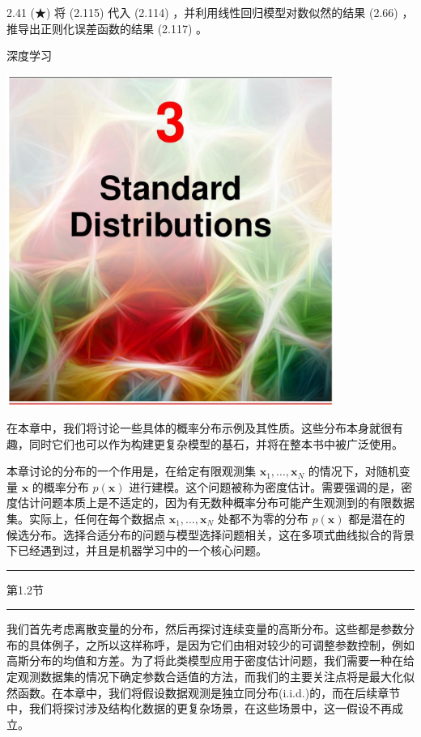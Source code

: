 \documentclass[10pt]{report}
\newcommand{\HRule}{\begin{center}\rule{0.9\linewidth}{0.2mm}\end{center}}
\begin{document}
2.41 (★) 将 (2.115) 代入 (2.114) ，并利用线性回归模型对数似然的结果 (2.66) ，推导出正则化误差函数的结果 (2.117) 。

深度学习

\begin{center}
\includegraphics[max width=0.8\textwidth]{images/0194e279-9b28-703a-88f4-c3ac21e2010d_84_473_351_1075_1086_0.jpg}
\end{center}
\hspace*{3em} 

在本章中，我们将讨论一些具体的概率分布示例及其性质。这些分布本身就很有趣，同时它们也可以作为构建更复杂模型的基石，并将在整本书中被广泛使用。

本章讨论的分布的一个作用是，在给定有限观测集 \({\mathbf{x}}_{1},\ldots ,{\mathbf{x}}_{N}\) 的情况下，对随机变量 \(\mathbf{x}\) 的概率分布 \(p\left( \mathbf{x}\right)\) 进行建模。这个问题被称为密度估计。需要强调的是，密度估计问题本质上是不适定的，因为有无数种概率分布可能产生观测到的有限数据集。实际上，任何在每个数据点 \({\mathbf{x}}_{1},\ldots ,{\mathbf{x}}_{N}\) 处都不为零的分布 \(p\left( \mathbf{x}\right)\) 都是潜在的候选分布。选择合适分布的问题与模型选择问题相关，这在多项式曲线拟合的背景下已经遇到过，并且是机器学习中的一个核心问题。

\HRule

第1.2节

\HRule

我们首先考虑离散变量的分布，然后再探讨连续变量的高斯分布。这些都是参数分布的具体例子，之所以这样称呼，是因为它们由相对较少的可调整参数控制，例如高斯分布的均值和方差。为了将此类模型应用于密度估计问题，我们需要一种在给定观测数据集的情况下确定参数合适值的方法，而我们的主要关注点将是最大化似然函数。在本章中，我们将假设数据观测是独立同分布(i.i.d.)的，而在后续章节中，我们将探讨涉及结构化数据的更复杂场景，在这些场景中，这一假设不再成立。
\end{document}
